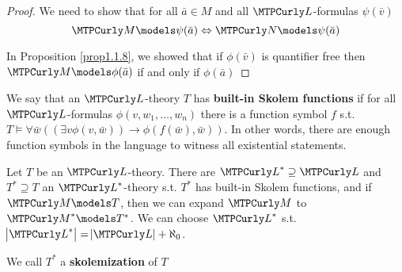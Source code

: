 \documentclass[11pt]{article}
\begin{document}
\begin{proof}
We need to show that for all \(\bar{a}\in M\) and all \(\call\)-formulas
\(\psi(\bar{v})\)
\begin{equation*}
\calm\models\psi(\bar{a})\Leftrightarrow\caln\models\psi(\bar{a})
\end{equation*}

In Proposition \ref{prop1.1.8}, we showed that if \(\phi(\bar{v})\) is quantifier
free then \(\calm\models\phi(\bar{a})\) if and only if \(\phi(\bar{a})\)
\end{proof}

We say that an \(\call\)-theory \(T\) has \textbf{built-in Skolem functions} if for all
\(\call\)-formulas \(\phi(v,w_1,\dots,w_n)\) there is a function symbol \(f\) s.t.\\
\(T\models\forall\bar{w}((\exists
   v\phi(v,\bar{w}))\to\phi(f(\bar{w}),\bar{w}))\). In other words, there are
enough function symbols in the language to witness all existential statements.

\begin{lemma}[]
\label{lemma2.3.6}
Let \(T\) be an \(\call\)-theory. There are \(\call^*\supseteq\call\) and 
\(T^*\supseteq T\) an \(\call^*\)-theory s.t. \(T^*\) has built-in Skolem
functions, and if \(\calm\models T\), then we can expand \(\calm\) to 
\(\calm^*\models T^*\). We can choose \(\call^*\) s.t.
\(\abs{\call^*}=\abs{\call}+\aleph_0\).

We call \(T^*\) a \textbf{skolemization} of \(T\)
\end{lemma}
\end{document}
